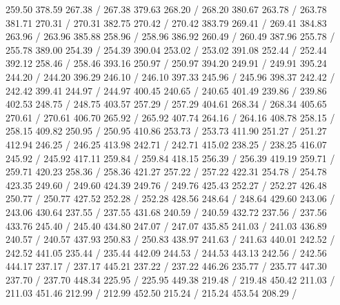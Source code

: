 { 259.50 378.59 267.38 /
 267.38 379.63 268.20 /
 268.20 380.67 263.78 /
 263.78 381.71 270.31 /
 270.31 382.75 270.42 /
 270.42 383.79 269.41 /
 269.41 384.83 263.96 /
 263.96 385.88 258.96 /
 258.96 386.92 260.49 /
 260.49 387.96 255.78 /
 255.78 389.00 254.39 /
 254.39 390.04 253.02 /
 253.02 391.08 252.44 /
 252.44 392.12 258.46 /
 258.46 393.16 250.97 /
 250.97 394.20 249.91 /
 249.91 395.24 244.20 /
 244.20 396.29 246.10 /
 246.10 397.33 245.96 /
 245.96 398.37 242.42 /
 242.42 399.41 244.97 /
 244.97 400.45 240.65 /
 240.65 401.49 239.86 /
 239.86 402.53 248.75 /
 248.75 403.57 257.29 /
 257.29 404.61 268.34 /
 268.34 405.65 270.61 /
 270.61 406.70 265.92 /
 265.92 407.74 264.16 /
 264.16 408.78 258.15 /
 258.15 409.82 250.95 /
 250.95 410.86 253.73 /
 253.73 411.90 251.27 /
 251.27 412.94 246.25 /
 246.25 413.98 242.71 /
 242.71 415.02 238.25 /
 238.25 416.07 245.92 /
 245.92 417.11 259.84 /
 259.84 418.15 256.39 /
 256.39 419.19 259.71 /
 259.71 420.23 258.36 /
 258.36 421.27 257.22 /
 257.22 422.31 254.78 /
 254.78 423.35 249.60 /
 249.60 424.39 249.76 /
 249.76 425.43 252.27 /
 252.27 426.48 250.77 /
 250.77 427.52 252.28 /
 252.28 428.56 248.64 /
 248.64 429.60 243.06 /
 243.06 430.64 237.55 /
 237.55 431.68 240.59 /
 240.59 432.72 237.56 /
 237.56 433.76 245.40 /
 245.40 434.80 247.07 /
 247.07 435.85 241.03 /
 241.03 436.89 240.57 /
 240.57 437.93 250.83 /
 250.83 438.97 241.63 /
 241.63 440.01 242.52 /
 242.52 441.05 235.44 /
 235.44 442.09 244.53 /
 244.53 443.13 242.56 /
 242.56 444.17 237.17 /
 237.17 445.21 237.22 /
 237.22 446.26 235.77 /
 235.77 447.30 237.70 /
 237.70 448.34 225.95 /
 225.95 449.38 219.48 /
 219.48 450.42 211.03 /
 211.03 451.46 212.99 /
 212.99 452.50 215.24 /
 215.24 453.54 208.29 /
}
